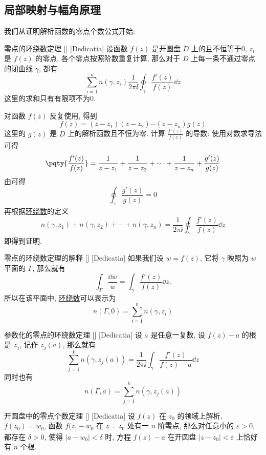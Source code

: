 \documentclass[UTF8]{ctexart}
\begin{document}
    \subsection{局部映射与幅角原理}
    我们从证明解析函数的零点个数公式开始: 
    \begin{thm}
        [UUID]
        {零点的环绕数定理}
        []
        [Dedicatia]
        设函数 \(f(z)\) 是开圆盘 \(D\) 上的 且不恒等于0,  \(z_i\) 是 \(f(z)\) 的零点, 各个零点按照阶数重复计算, 那么对于 \(D\) 上每一条不通过零点的闭曲线 \(\gamma\), 都有
        \[\sum_{i=1}^n n(\gamma, z_i)\frac{1}{2\pi\ii}\oint_\gamma\frac{f'(z)}{f(z)}\dd{z} \] 
        这里的求和只有有限项不为0.
    \end{thm}
    \begin{prf}
        对函数 \(f(z)\) 反复使用\TaylorThm, 得到
        \[f(z)=(z-z_1)(z-z_2)\cdots(z-z_n)g(z)\]
        这里的 \(g(z)\) 是 \(D\) 上的解析函数且不恒为零. 计算 \(\frac{f'(z)}{f(z)}\) 的导数: 使用对数求导法可得
        \[\pqty{\frac{f'(z)}{f(z)}}=\frac{1}{z-z_1}+\frac{1}{z-z_2}+\cdots+\frac{1}{z-z_n}+\frac{g'(z)}{g(z)}\]
        由\CauchyThm 可得
        \[\oint_\gamma\frac{g'(z)}{g(z)}=0 \]
        再根据\hyperref[dfn:WindingNumber]{环绕数}的定义
        \[n(\gamma,z_1)+n(\gamma,z_2)+\cdots+n(\gamma,z_n)=\frac{1}{2\pi\ii}\oint_\gamma \frac{f'(z)}{f(z)}\dd{z}\]
        即得到证明. 
    \end{prf}
    \begin{crl}
        [UUID]
        {零点的环绕数定理的解释}
        []
        [Dedicatia]
        如果我们设 \(w=f(z)\), 它将 \(\gamma\) 映照为 \(w\) 平面的 \(\Gamma\), 那么就有
        \[\int_\Gamma\frac{\dd w}{w}=\int_\gamma \frac{f'(z)}{f(z)}\dd{z}.\]
        所以在该平面中, \hyperref[dfn:WindingNumber]{环绕数}可以表示为
        \[n(\Gamma,0)=\sum_{i=1}^n n(\gamma,z_i)\]
    \end{crl}
    \begin{crl}
        [UUID]
        {参数化的零点的环绕数定理}
        []
        [Dedicatia]
        设 \(a\) 是任意一复数, 设 \(f(z)-a\) 的根是 \(z_j\), 记作 \(z_j(a)\), 那么就有
        \[\sum_{j=1}^{k}n(\gamma,z_j(a))=\frac{1}{2\pi\ii}\int_\gamma\frac{f'(z)}{f(z)-a}\dd{z}\]
        同时也有
        \[n(\Gamma,a)=\sum_{j=1}^k n(\gamma,z_j(a))\]
    \end{crl}
    \begin{thm}
        [UUID]
        {开圆盘中的零点个数定理}
        []
        [Dedicatia]
        设 \(f(z)\) 在 \(z_0\) 的领域上解析,  \(f(z_0)=w_0\), 函数 \(f(z_)-w_0\) 在 \(z=z_0\) 处有一 \(n\) 阶零点, 那么对任意小的 \(\varepsilon>0\), 都存在 \(\delta>0\), 使得 \(|a-w_0|<\delta\) 时, 方程 \(f(z)-a\) 在开圆盘 \(|z-z_0|<\varepsilon\) 上恰好有 \(n\) 个根. 
    \end{thm}
\end{document}
